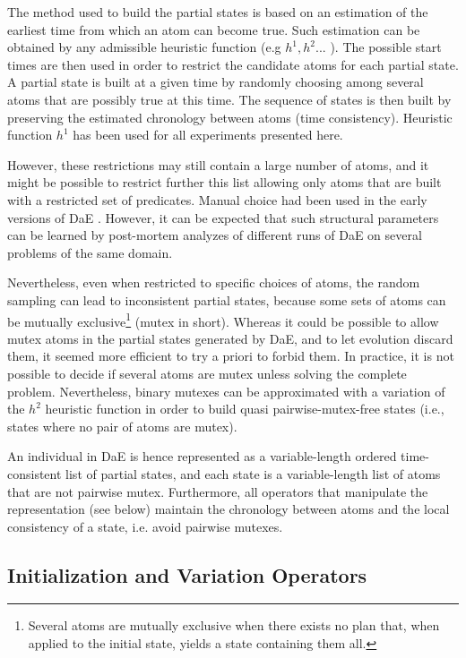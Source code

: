 \documentclass{acm_proc_article-sp}
\begin{document}
The method used to build the partial states is based on an estimation of the earliest time from which an atom can become true. Such estimation can be obtained by any admissible heuristic function (e.g $h^1,h^2...$ \cite{HaslumGeffner-AIPS-2000}). The possible start times are then used in order to restrict the candidate atoms for each partial state. A partial state is built at a given time by randomly choosing among several atoms that are possibly true at this time. The sequence of states is then built by preserving the estimated chronology between atoms (time consistency). Heuristic function $h^1$ has been used for all experiments presented here.

However, these restrictions may still contain a large number of atoms, and it might be possible to restrict further this list allowing only atoms that are built with a restricted set of predicates. Manual choice had been used in the early versions of DaE \cite{deterministic:IPC6}. However, it can be expected that such structural parameters can be learned by post-mortem analyzes of different runs of DaE on several problems of the same domain. 

Nevertheless, even when restricted to specific choices of atoms, the random sampling can lead to inconsistent partial states, because some sets of atoms can be mutually exclusive\footnote{Several atoms are mutually exclusive when there exists no plan that, when applied to the initial state, yields a state containing them all.} (mutex in short). Whereas it could be possible to allow mutex atoms in the partial states generated by DaE, and to let evolution discard them, it seemed more efficient to try a priori to forbid them. In practice, it is not possible to decide if several atoms are mutex unless solving the complete problem. Nevertheless, binary mutexes can be approximated with a variation of the $h^2$ heuristic function \cite{HaslumGeffner-AIPS-2000} in order to build quasi pairwise-mutex-free states (i.e., states where no pair of atoms are mutex).

An individual in DaE is hence represented as a variable-length ordered time-consistent list of partial states, and each state is a variable-length list of atoms that are not pairwise mutex. Furthermore, all operators that manipulate the representation (see below) maintain the chronology between atoms and the local consistency of a state, i.e. avoid pairwise mutexes.


\subsection{Initialization and Variation Operators}
\label{section:operators}
\end{document}

